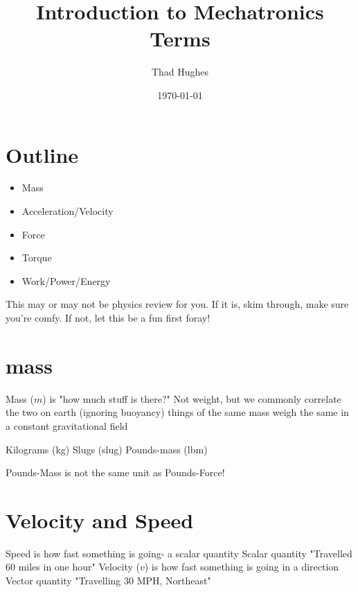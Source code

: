 \documentclass{article}%
\title{Introduction to Mechatronics Terms}
\author{Thad Hughes}
\date{\today}
\newenvironment{block}[1]{
	\tcolorbox[beamer,
	noparskip,breakable,
	colback=LightGreen,colframe=DarkGreen,
	colbacklower=LimeGreen!75!LightGreen,
	title=#1]}
	{\endtcolorbox}
\newenvironment{alertblock}[1]{
	\tcolorbox[beamer,
	noparskip,breakable,
	colback=LightGreen,colframe=DarkGreen,
	colbacklower=LimeGreen!75!LightGreen,
	title=#1]}
	{\endtcolorbox}
\newenvironment{example}{
	\tcolorbox[beamer,
	noparskip,breakable,
	colback=LightGreen,colframe=DarkGreen,
	colbacklower=LimeGreen!75!LightGreen,
	title=Examples]}
	{\endtcolorbox}
\begin{document}
\maketitle

\section{Outline}

\begin{itemize}
	\item Mass
	\item Acceleration/Velocity
	\item Force
	\item Torque
	\item Work/Power/Energy
\end{itemize}

\begin{block}{}
	This may or may not be physics review for you. If it is, skim through, make sure you're comfy. If not, let this be a fun first foray!
\end{block}


\section{mass}

\begin{outline}
	\1 Mass ($m$) is "how much stuff is there?"
	\1 Not weight, but we commonly correlate the two on earth
		\2 (ignoring buoyancy) things of the same mass weigh the same in a constant gravitational field
\end{outline}

\begin{example}
\begin{outline}
	\1 Kilograms (kg)
	\1 Slugs (slug)
	\1 Pounds-mass (lbm)
\end{outline}
\end{example}

\begin{alertblock}{Warning}
	Pounds-Mass is not the same unit as Pounds-Force!
\end{alertblock}


\section{Velocity and Speed}

\begin{outline}
	\1 Speed is how fast something is going- a scalar quantity
		\2 Scalar quantity
		\2 "Travelled 60 miles in one hour"
	\1 Velocity ($v$) is how fast something is going in a direction
		\2 Vector quantity
		\2 "Travelling 30 MPH, Northeast"
\end{outline}
\end{document}
